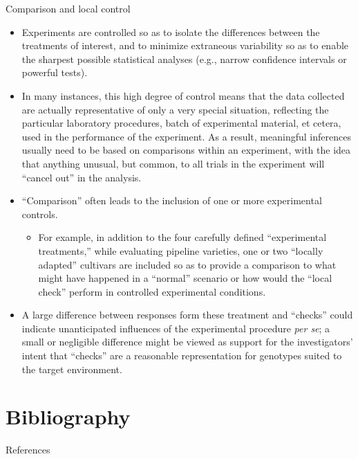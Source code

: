 \documentclass[
  ignorenonframetext,
  aspectratio=169]{beamer}
\providecommand{\tightlist}{%
  \setlength{\itemsep}{0pt}\setlength{\parskip}{0pt}}
\begin{document}
\begin{frame}{Comparison and local control}
\protect\hypertarget{comparison-and-local-control}{}
\small

\begin{itemize}
\tightlist
\item
  Experiments are controlled so as to isolate the differences between
  the treatments of interest, and to minimize extraneous variability so
  as to enable the sharpest possible statistical analyses (e.g., narrow
  confidence intervals or powerful tests). \scriptsize
\item
  In many instances, this high degree of control means that the data
  collected are actually representative of only a very special
  situation, reflecting the particular laboratory procedures, batch of
  experimental material, et cetera, used in the performance of the
  experiment. As a result, meaningful inferences usually need to be
  based on comparisons within an experiment, with the idea that anything
  unusual, but common, to all trials in the experiment will ``cancel
  out'' in the analysis. \small
\item
  ``Comparison'' often leads to the inclusion of one or more
  experimental controls.

  \begin{itemize}
  \tightlist
  \item
    For example, in addition to the four carefully defined
    ``experimental treatments,'' while evaluating pipeline varieties,
    one or two ``locally adapted'' cultivars are included so as to
    provide a comparison to what might have happened in a ``normal''
    scenario or how would the ``local check'' perform in controlled
    experimental conditions.
  \end{itemize}
\item
  A large difference between responses form these treatment and
  ``checks'' could indicate unanticipated influences of the experimental
  procedure \emph{per se}; a small or negligible difference might be
  viewed as support for the investigators' intent that ``checks'' are a
  reasonable representation for genotypes suited to the target
  environment.
\end{itemize}
\end{frame}

\hypertarget{bibliography}{%
\section{Bibliography}\label{bibliography}}

\begin{frame}{References}
\protect\hypertarget{references}{}
\end{frame}
\end{document}
